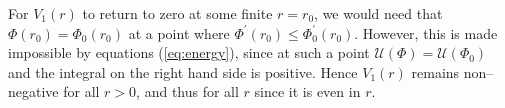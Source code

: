 For $V_1(r)$ to return to zero at some finite $r=r_0$, we would need that $\Phi(r_0)=\Phi_0(r_0)$ at a point where $\Phi^\prime(r_0)\leq\Phi_0^\prime(r_0)$. However, this is made impossible by equations (\ref{eq:energy}), since at such a point $\mathcal{U}(\Phi)=\mathcal{U}(\Phi_0)$ and the integral on the right hand side is positive. Hence $V_1(r)$ remains non--negative for all $r>0$, and thus for all $r$ since it is even in $r$.
\koniec







